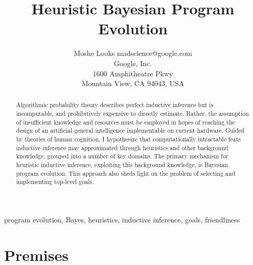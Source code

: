 \documentclass[twoside,11pt]{article}
\begin{document}
 \sloppy
\title{Heuristic Bayesian Program Evolution}
\author{\name Moshe Looks \email madscience@google.com \\
       \addr Google, Inc. \\
       1600 Amphitheatre Pkwy \\
       Mountain View, CA 94043, USA}
\maketitle

\begin{abstract}
  Algorithmic probability theory describes perfect inductive inference but is
  incomputable, and prohibitively expensive to directly estimate. Rather, the
  assumption of insufficient knowledge and resources must be employed in hopes
  of reaching the design of an artificial general intelligence implementable on
  current hardware. Guided by theories of human cognition, I hypothesize that
  computationally intractable feats inductive inference may approximated
  through heuristics and other background knowledge, grouped into a number of
  key domains. The primary mechanism for heuristic inductive inference,
  exploiting this background knowledge, is Bayesian program evolution. This
  approach also sheds light on the problem of selecting and implementing
  top-level goals.
\end{abstract}

\begin{keywords}
  program evolution, Bayes, heuristics, inductive inference, goals,
  friendliness
\end{keywords}

\section{Premises}
\end{document}
